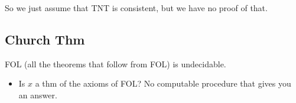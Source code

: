 \documentclass[11pt]{article}
\begin{document}
So we just assume that TNT is consistent, but we have no proof of that.
\subsection{Church Thm}
\label{sec:org8a633c8}
FOL (all the theorems that follow from FOL) is undecidable.
\begin{itemize}
\item Is \(x\) a thm of the axioms of FOL? No computable procedure that gives you an answer.
\end{itemize}
\end{document}

